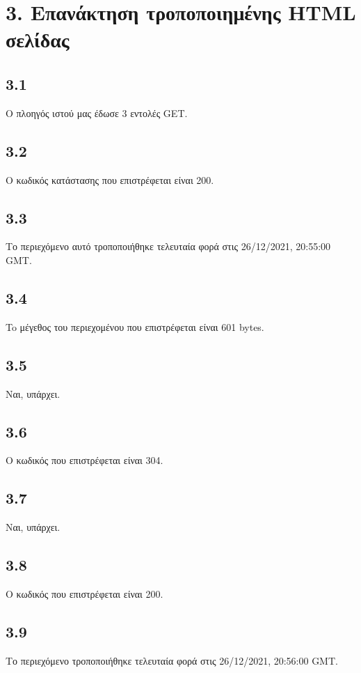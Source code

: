 	\section*{3. Επανάκτηση τροποποιημένης HTML σελίδας}

		\subsection*{3.1}
			Ο πλοηγός ιστού μας έδωσε 3 εντολές GET.

		\subsection*{3.2}
			Ο κωδικός κατάστασης που επιστρέφεται είναι 200.

		\subsection*{3.3}
			Το περιεχόμενο αυτό τροποποιήθηκε τελευταία φορά στις 26/12/2021, 20:55:00 GMT.

		\subsection*{3.4}
			To μέγεθος του περιεχομένου που επιστρέφεται είναι 601 bytes.

		\subsection*{3.5}
			Ναι, υπάρχει.

		\subsection*{3.6}
			Ο κωδικός που επιστρέφεται είναι 304.

		\subsection*{3.7}
			Ναι, υπάρχει.

		\subsection*{3.8}
			Ο κωδικός που επιστρέφεται είναι 200.

		\subsection*{3.9}
			Το περιεχόμενο τροποποιήθηκε τελευταία φορά στις 26/12/2021, 20:56:00 GMT.


